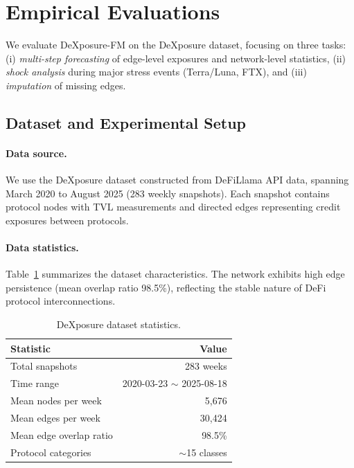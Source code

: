 \section{Empirical Evaluations}
\label{sec:evaluation}

We evaluate DeXposure-FM on the DeXposure dataset, focusing on three tasks: (i) \textit{multi-step forecasting} of edge-level exposures and network-level statistics, (ii) \textit{shock analysis} during major stress events (Terra/Luna, FTX), and (iii) \textit{imputation} of missing edges.

\subsection{Dataset and Experimental Setup}
\label{subsec:dataset}

\paragraph{Data source.}
We use the DeXposure dataset constructed from DeFiLlama API data, spanning March 2020 to August 2025 (283 weekly snapshots). Each snapshot contains protocol nodes with TVL measurements and directed edges representing credit exposures between protocols.

\paragraph{Data statistics.}
Table~\ref{tab:data-stats} summarizes the dataset characteristics. The network exhibits high edge persistence (mean overlap ratio 98.5\%), reflecting the stable nature of DeFi protocol interconnections.

\begin{table}[t]
\centering
\small
\begin{tabular}{lr}
\hline
\textbf{Statistic} & \textbf{Value} \\
\hline
Total snapshots & 283 weeks \\
Time range & 2020-03-23 $\sim$ 2025-08-18 \\
Mean nodes per week & 5,676 \\
Mean edges per week & 30,424 \\
Mean edge overlap ratio & 98.5\% \\
Protocol categories & $\sim$15 classes \\
\hline
\end{tabular}
\caption{DeXposure dataset statistics.}
\label{tab:data-stats}
\end{table}

